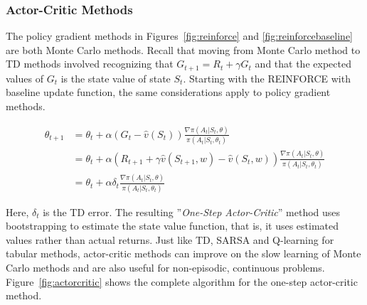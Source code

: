 \subsubsection*{Actor-Critic Methods}

The policy gradient methods in Figures~\ref{fig:reinforce} and \ref{fig:reinforcebaseline} are both Monte Carlo methods. Recall that moving from Monte Carlo method to TD methods involved recognizing that $G_{t+1} = R_t + \gamma G_t$ and that the expected values of $G_t$ is the state value of state $S_t$. Starting with the REINFORCE with baseline update function, the same considerations apply to policy gradient methods.

\begin{align*}
\theta_{t+1} &= \theta_t + \alpha (G_{t} - \hat{v}(S_t)) \frac{\nabla \pi(A_t | S_t, \theta)}{\pi(A_t | S_t, \theta_t)} \\
&= \theta_t + \alpha (R_{t+1} + \gamma \hat{v}(S_{t+1}, w) - \hat{v}(S_t, w)) \frac{\nabla \pi(A_t | S_t, \theta)}{\pi(A_t | S_t, \theta_t)} \\
&= \theta_t + \alpha \delta_t \frac{\nabla \pi(A_t | S_t, \theta)}{\pi(A_t | S_t, \theta_t)}
\end{align*}

Here, $\delta_t$ is the TD error. The resulting ''\emph{One-Step Actor-Critic}'' method uses bootstrapping to estimate the state value function, that is, it uses estimated values rather than actual returns. Just like TD, SARSA and Q-learning for tabular methods, actor-critic methods can improve on the slow learning of Monte Carlo methods and are also useful for non-episodic, continuous problems. Figure~\ref{fig:actorcritic} shows the complete algorithm for the one-step actor-critic method.

